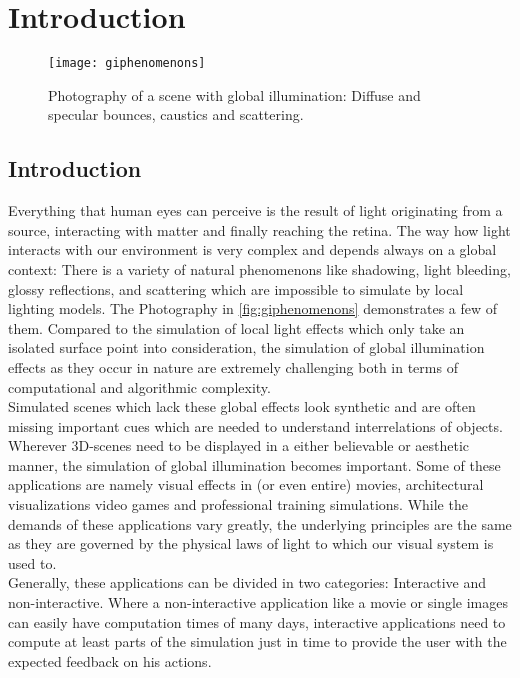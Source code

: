 \documentclass[thesis.tex]{subfiles}
\begin{document}
\chapter{Introduction}
\label{chap:introduction}

\begin{figure}[h]
\centering
\texttt{[image: giphenomenons]}
\caption{\cite{bib:RealtimeGIOverview} Photography of a scene with global illumination: Diffuse and specular bounces, caustics and scattering.}
\label{fig:giphenomenons}
\end{figure}

\section{Introduction}
Everything that human eyes can perceive is the result of light originating from a source, interacting with matter and finally reaching the retina.
The way how light interacts with our environment is very complex and depends always on a global context:
There is a variety of natural phenomenons like shadowing, light bleeding, glossy reflections, and scattering which are impossible to simulate by local lighting models.
The Photography in \autoref{fig:giphenomenons} demonstrates a few of them.
Compared to the simulation of local light effects which only take an isolated surface point into consideration, the simulation of global illumination effects as they occur in nature are extremely challenging both in terms of computational and algorithmic complexity.
\\
Simulated scenes which lack these global effects look synthetic and are often missing important cues which are needed to understand interrelations of objects.
Wherever 3D-scenes need to be displayed in a either believable or aesthetic manner, the simulation of global illumination becomes important.
Some of these applications are namely visual effects in (or even entire) movies, architectural visualizations video games and professional training simulations.
While the demands of these applications vary greatly, the underlying principles are the same as they are governed by the physical laws of light to which our visual system is used to.
\\
Generally, these applications can be divided in two categories: Interactive and non-interactive.
Where a non-interactive application like a movie or single images can easily have computation times of many days, interactive applications need to compute at least parts of the simulation just in time to provide the user with the expected feedback on his actions.
\end{document}
